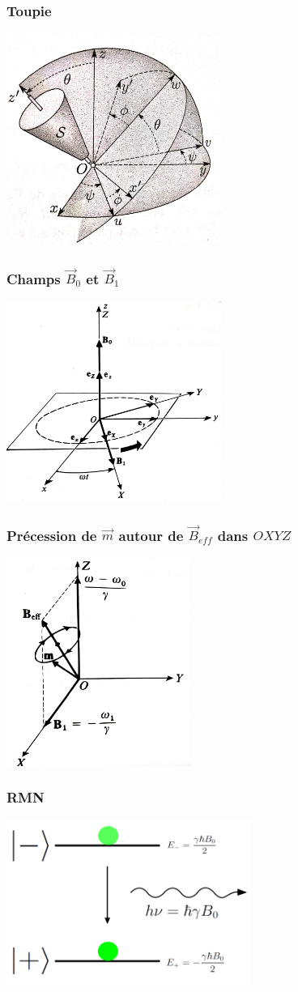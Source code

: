 \documentclass{beamer}
\begin{document}
\begin{frame}
\frametitle{Toupie}
\centerline{\includegraphics[width=7cm]{euler}}
\end{frame}

\begin{frame}
\frametitle{Champs $\vec{B}_0$ et $\vec{B}_1$}
\centerline{\includegraphics[width=7cm]{champs}}
\end{frame}

\begin{frame}
\frametitle{Précession de $\vec{m}$ autour de $\vec{B}_{eff}$ dans $OXYZ$}
\centerline{\includegraphics[width=6cm]{bef}}
\end{frame}

\begin{frame}
\frametitle{RMN}
\centerline{\includegraphics[width=8cm]{RMN_emission}}
\end{frame}
\end{document}

